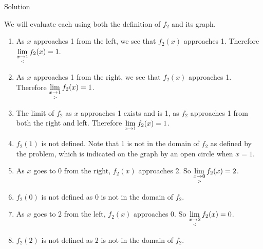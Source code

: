 \begin{example}
Solution 


We will evaluate each using both the definition of $f_2$ and its graph.
		\begin{enumerate}
		\item		As $x$ approaches 1 from the left, we see that $f_2(x)$ approaches 1. Therefore $\displaystyle \lim_{x\underset{<}{\rightarrow}1} f_2(x)=1.$
		\item		As $x$ approaches 1 from the right, we see that  $f_2(x)$ approaches 1. Therefore $\displaystyle \lim_{x\underset{>}{\rightarrow}1} f_2(x)=1$.
		\item		The limit of $f_2$ as $x$ approaches 1 exists and is 1, as $f_2$ approaches 1 from both the right and left. Therefore $\displaystyle \lim_{x\to 1} f_2(x)=1$.
		\item		$f_2(1)$ is not defined. Note that 1 is not in the domain of $f_2$ as defined by the problem, which is indicated on the graph by an open circle when $x=1$.
		\item		As $x$ goes to 0 from the right, $f_2(x)$ approaches 2. So $\displaystyle \lim_{x\underset{>}{\rightarrow}0} f_2(x)=2$.
		\item		$f_2(0)$  is not defined as $0$ is not in the domain of $f_2$.
		\item		As $x$ goes to 2 from the left, $f_2(x)$ approaches 0. So $\displaystyle \lim_{x\underset{<}{\rightarrow}2} f_2(x)=0$.
		\item		$f_2(2)$  is not defined as 2 is not in the domain of $f_2$.
		\end{enumerate}
\end{example}


